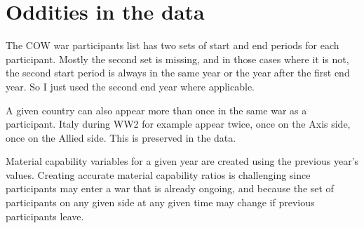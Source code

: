\section{Oddities in the data}

The COW war participants list has two sets of start and end periods for each participant. Mostly the second set is missing, and in those cases where it is not, the second start period is always in the same year or the year after the first end year. So I just used the second end year where applicable.

A given country can also appear more than once in the same war as a participant. Italy during WW2 for example appear twice, once on the Axis side, once on the Allied side. This is preserved in the data.

Material capability variables for a given year are created using the previous year's values. Creating accurate material capability ratios is challenging since participants may enter a war that is already ongoing, and because the set of participants on any given side at any given time may change if previous participants leave.